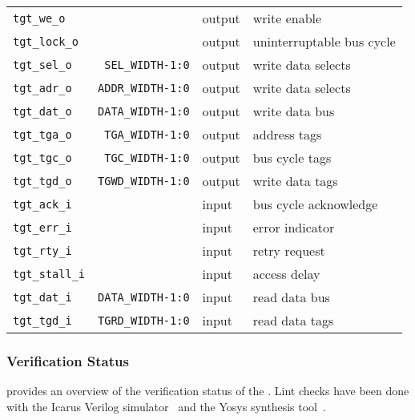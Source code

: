 \begin{center}
\begin{longtable}{|l|r|l|l|}
    \texttt{tgt\_we\_o}          &                          & output & write enable              \\
    \texttt{tgt\_lock\_o}        &                          & output & uninterruptable bus cycle \\
    \texttt{tgt\_sel\_o}         & \texttt{SEL\_WIDTH-1:0}  & output & write data selects        \\
    \texttt{tgt\_adr\_o}         & \texttt{ADDR\_WIDTH-1:0} & output & write data selects        \\
    \texttt{tgt\_dat\_o}         & \texttt{DATA\_WIDTH-1:0} & output & write data bus            \\
    \texttt{tgt\_tga\_o}         & \texttt{TGA\_WIDTH-1:0}  & output & address tags              \\
    \texttt{tgt\_tgc\_o}         & \texttt{TGC\_WIDTH-1:0}  & output & bus cycle tags            \\
    \texttt{tgt\_tgd\_o}         & \texttt{TGWD\_WIDTH-1:0} & output & write data tags           \\
    \texttt{tgt\_ack\_i}         &                          & input  & bus cycle acknowledge     \\
    \texttt{tgt\_err\_i}         &                          & input  & error indicator           \\
    \texttt{tgt\_rty\_i}         &                          & input  & retry request             \\
    \texttt{tgt\_stall\_i}       &                          & input  & access delay              \\
    \texttt{tgt\_dat\_i}         & \texttt{DATA\_WIDTH-1:0} & input  & read data bus             \\
    \texttt{tgt\_tgd\_i}         & \texttt{TGRD\_WIDTH-1:0} & input  & read data tags            \\   
  \end{longtable}
\end{center}  

\subsubsection{Verification Status}
\label{arb:verif}

 provides an overview of the verification status of the .
Lint checks have been done with the Icarus Verilog simulator~\cite{iverilog} and the Yosys synthesis tool~\cite{yosys}.

